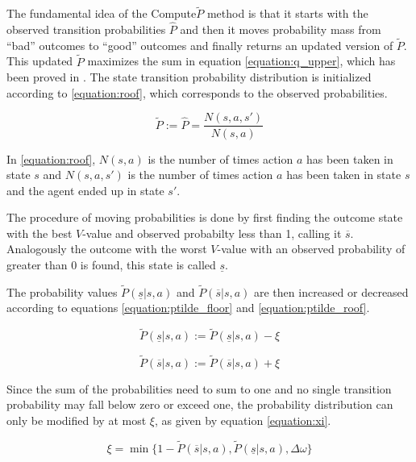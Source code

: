 The fundamental idea of the Compute$\tilde{P}$ method is that it starts with
the observed transition probabilities $\hat{P}$ and then it moves probability
mass from ``bad'' outcomes to ``good'' outcomes and finally returns an updated
version of $\tilde{P}$. This updated $\tilde{P}$ maximizes the sum in equation
\eqref{equation:q_upper}, which has been proved in \textcite{Strehl20081309}.
The state transition probability distribution is initialized according to
\eqref{equation:roof}, which corresponds to the observed probabilities.

\begin{equation}
\label{equation:roof}
\tilde{P} := \hat{P} = \frac{N(s,a,s')}{N(s,a)}
\end{equation}

In \eqref{equation:roof}, $N(s, a)$ is the number of times action $a$ has been taken in
state $s$ and $N(s, a, s')$ is the number of times action $a$ has been taken in
state $s$ and the agent ended up in state $s'$.

The procedure of moving probabilities is done by first finding the outcome
state with the best $V$-value and observed probabilty less than 1, calling it
$\overline{s}$. Analogously the outcome with the worst $V$-value with an
observed probability of greater than 0 is found, this state is called
$\underline{s}$. 

The probability values $\tilde{P}(\underline{s}|s,a)$ and
$\tilde{P}(\overline{s}|s,a)$ are then increased or decreased according to
equations \eqref{equation:ptilde_floor} and \eqref{equation:ptilde_roof}.

\begin{equation}
\label{equation:ptilde_floor}
\tilde{P}(\underline{s}|s,a) := \tilde{P}(\underline{s}|s,a)-\xi
\end{equation}

\begin{equation}
\label{equation:ptilde_roof}
\tilde{P}(\overline{s}|s,a) := \tilde{P}(\overline{s}|s,a)+\xi
\end{equation}

Since the sum of the probabilities need to sum to one and 
no single transition probability may fall below zero or exceed one, the probability distribution can only be modified by at most $\xi$, as given by
equation \eqref{equation:xi}. 

\begin{equation}
\label{equation:xi}
\xi = \min\{
  1 - \tilde{P}(\overline{s} | s, a)
  , \tilde{P}(\underline{s} | s, a)
  , \Delta \omega 
\}
\end{equation}

